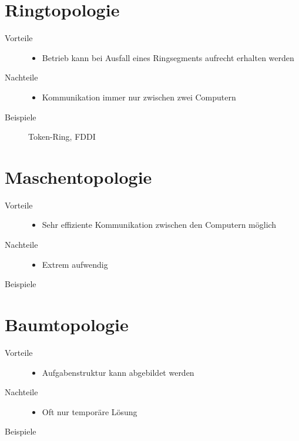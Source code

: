 \section{Ringtopologie}

\begin{description}
\item[Vorteile]
\begin{itemize}
\item Betrieb kann bei Ausfall eines Ringsegments aufrecht erhalten werden
\end{itemize}
\item[Nachteile]
\begin{itemize}
\item Kommunikation immer nur zwischen zwei Computern
\end{itemize}
\item[Beispiele] Token-Ring, FDDI
\end{description}

\section{Maschentopologie}

\begin{description}
\item[Vorteile]
\begin{itemize}
\item Sehr effiziente Kommunikation zwischen den Computern möglich
\end{itemize}
\item[Nachteile]
\begin{itemize}
\item Extrem aufwendig
\end{itemize}
\item[Beispiele]
\end{description}


\section{Baumtopologie}

\begin{description}
\item[Vorteile]
\begin{itemize}
\item Aufgabenstruktur kann abgebildet werden
\end{itemize}
\item[Nachteile]
\begin{itemize}
\item Oft nur temporäre Lösung
\end{itemize}
\item[Beispiele]
\end{description}

